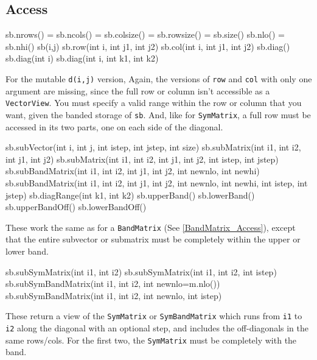 \documentclass[twoside,letterpaper,11pt]{article}
\renewcommand{\tt}[1]{{\lstinline {#1}}}
\begin{document}
\subsection{Access}
\label{SymBandMatrix_Access}

\begin{tmvcode}
sb.nrows() = sb.ncols() = sb.colsize() = sb.rowsize() = sb.size()
sb.nlo() = sb.nhi()
sb(i,j)
sb.row(int i, int j1, int j2)
sb.col(int i, int j1, int j2)
sb.diag()
sb.diag(int i)
sb.diag(int i, int k1, int k2)
\end{tmvcode}
For the mutable \tt{d(i,j)} version, 
Again, the versions of \tt{row} and \tt{col} with only one argument are
missing, since the full row or column isn't accessible as a \tt{VectorView}.
You must specify a valid range within the row or column that you want, 
given the banded storage of \tt{sb}.  And, like for \tt{SymMatrix}, a full row
must be accessed in its two parts, one on each side of the diagonal.

\begin{tmvcode}
sb.subVector(int i, int j, int istep, int jstep, int size)
sb.subMatrix(int i1, int i2, int j1, int j2)
sb.subMatrix(int i1, int i2, int j1, int j2, int istep, int jstep)
sb.subBandMatrix(int i1, int i2, int j1, int j2, int newnlo, int newhi)
sb.subBandMatrix(int i1, int i2, int j1, int j2, int newnlo, int newhi, 
      int istep, int jstep)
sb.diagRange(int k1, int k2)
sb.upperBand()
sb.lowerBand()
sb.upperBandOff()
sb.lowerBandOff()
\end{tmvcode}
These work the same as for a \tt{BandMatrix}
(See \ref{BandMatrix_Access}),
except that the entire
subvector or submatrix must be completely within the upper or lower band.


\begin{tmvcode}
sb.subSymMatrix(int i1, int i2)
sb.subSymMatrix(int i1, int i2, int istep)
sb.subSymBandMatrix(int i1, int i2, int newnlo=m.nlo())
sb.subSymBandMatrix(int i1, int i2, int newnlo, int istep)
\end{tmvcode}
These return a view of the \tt{SymMatrix} or \tt{SymBandMatrix} which runs
from \tt{i1} to \tt{i2} along the diagonal with an optional step,
and includes the off-diagonals in the same rows/cols.  For the first two,
the \tt{SymMatrix} must be completely with the band.
\end{document}

